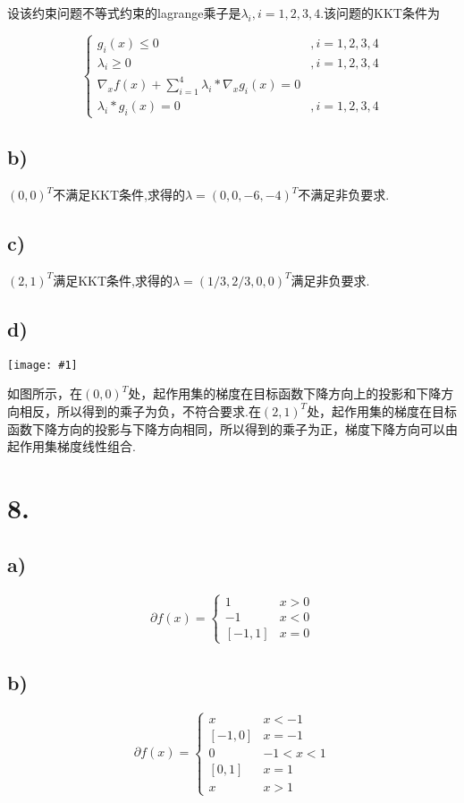 \documentclass{article}
\newcommand{\p}[1]{\texttt{[image: \#1]}}
\begin{document}
	设该约束问题不等式约束的lagrange乘子是$\lambda_i,i=1,2,3,4$.该问题的KKT条件为
	
	\[\left\{\begin{array}{cl}
		g_i(x)\leq 0 & ,i=1,2,3,4\\
		\lambda_i \geq 0 & ,i = 1,2,3,4\\
		\nabla_x f(x) + \sum_{i=1}^4 \lambda_i * \nabla_x g_i(x) = 0 &\\
		\lambda_i * g_i(x) = 0&,i=1,2,3,4
	\end{array}\right.\]


	\subsection*{b)}
	
	$(0,0)^T$不满足KKT条件,求得的\(\lambda = (0,0,-6,-4)^T\)不满足非负要求.

	\subsection*{c)}
	
	$(2,1)^T$满足KKT条件,求得的\(\lambda = (1/3,2/3,0,0)^T\)满足非负要求.

	\subsection*{d)}

	\p{1}
	
	如图所示，在$(0,0)^T$处，起作用集的梯度在目标函数下降方向上的投影和下降方向相反，所以得到的乘子为负，不符合要求.在$(2,1)^T$处，起作用集的梯度在目标函数下降方向的投影与下降方向相同，所以得到的乘子为正，梯度下降方向可以由起作用集梯度线性组合.

	\section*{8.}

	\subsection*{a)}
	\[\partial f(x) = \left\{\begin{array}{cl}
	1 & x > 0\\
	-1 & x < 0\\
	\left[-1,1\right] & x = 0
	\end{array}\right.\]

	\subsection*{b)}
	\[\partial f(x) = \left\{\begin{array}{cl}
	x & x < -1\\
	\left[-1,0\right] & x = -1\\
	0 & -1 < x < 1\\
	\left[0,1\right] & x = 1\\
	x & x > 1
	\end{array}\right.\]
\end{document}
